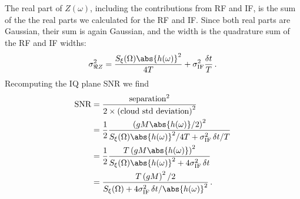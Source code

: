 The real part of $Z(\omega)$, including the contributions from RF and IF, is the sum of the the real parts we calculated for the RF and IF.
Since both real parts are Gaussian, their sum is again Gaussian, and the width is the quadrature sum of the RF and IF widths:
\begin{equation}
  \sigma_{\Re Z}^2 =
    \frac{S_\xi(\Omega) \abs{h(\omega)}^2}{4T}
    + \sigma_\text{IF}^2 \frac{\delta t}{T} \, .
\end{equation}
Recomputing the IQ plane SNR we find
\begin{align}
  \text{SNR}
    &= \frac{\text{separation}^2}{2 \times \left( \text{cloud std deviation} \right)^2} \nonumber \\
    &= \frac{1}{2}
       \frac{\left( g M \abs{h(\omega)} / 2 \right)^2}
            {S_\xi(\Omega) \abs{h(\omega)}^2 / 4T + \sigma_\text{IF}^2 \, \delta t / T} \nonumber \\
    &= \frac{1}{2}
       \frac{T \left( g M \abs{h(\omega)} \right)^2}
            {S_\xi(\Omega) \abs{h(\omega)}^2 + 4 \sigma_\text{IF}^2 \, \delta t} \nonumber \\
    &= \frac{T \left( g M \right)^2 / 2}
            {S_\xi(\Omega) + 4 \sigma_\text{IF}^2 \, \delta t / \abs{h(\omega)}^2} \nonumber
  \, .
\end{align}

